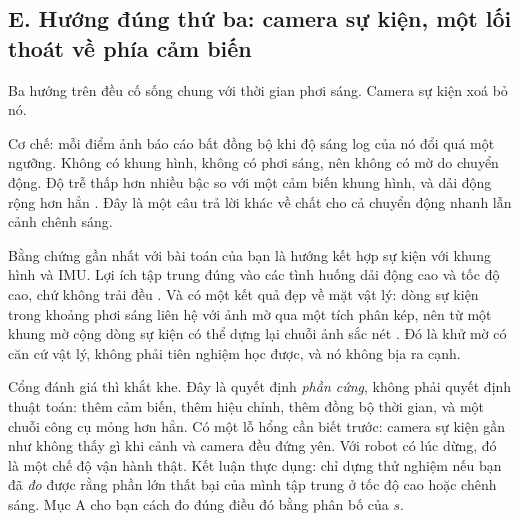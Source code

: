 \documentclass[../../deep_learning.tex]{subfiles}
\begin{document}
\subsection{E. Hướng đúng thứ ba: camera sự kiện, một lối thoát về phía cảm biến}

Ba hướng trên đều cố sống chung với thời gian phơi sáng. Camera sự kiện xoá bỏ nó.

Cơ chế: mỗi điểm ảnh báo cáo bất đồng bộ khi độ sáng log của nó đổi quá một ngưỡng. Không có khung hình, không có phơi sáng, nên không có mờ do chuyển động. Độ trễ thấp hơn nhiều bậc so với một cảm biến khung hình, và dải động rộng hơn hẳn \cite{gallego2022eventsurvey}. Đây là một câu trả lời khác về chất cho cả chuyển động nhanh lẫn cảnh chênh sáng.

Bằng chứng gần nhất với bài toán của bạn là hướng kết hợp sự kiện với khung hình và IMU. Lợi ích tập trung đúng vào các tình huống dải động cao và tốc độ cao, chứ không trải đều \cite{vidal2018ultimate}. Và có một kết quả đẹp về mặt vật lý: dòng sự kiện trong khoảng phơi sáng liên hệ với ảnh mờ qua một tích phân kép, nên từ một khung mờ cộng dòng sự kiện có thể dựng lại chuỗi ảnh sắc nét \cite{pan2019edi}. Đó là khử mờ có căn cứ vật lý, không phải tiên nghiệm học được, và nó không bịa ra cạnh.

Cổng đánh giá thì khắt khe. Đây là quyết định \emph{phần cứng}, không phải quyết định thuật toán: thêm cảm biến, thêm hiệu chỉnh, thêm đồng bộ thời gian, và một chuỗi công cụ mỏng hơn hẳn. Có một lỗ hổng cần biết trước: camera sự kiện gần như không thấy gì khi cảnh và camera đều đứng yên. Với robot có lúc dừng, đó là một chế độ vận hành thật. Kết luận thực dụng: chỉ dựng thử nghiệm nếu bạn đã \emph{đo} được rằng phần lớn thất bại của mình tập trung ở tốc độ cao hoặc chênh sáng. Mục A cho bạn cách đo đúng điều đó bằng phân bố của \(s\).
\end{document}
